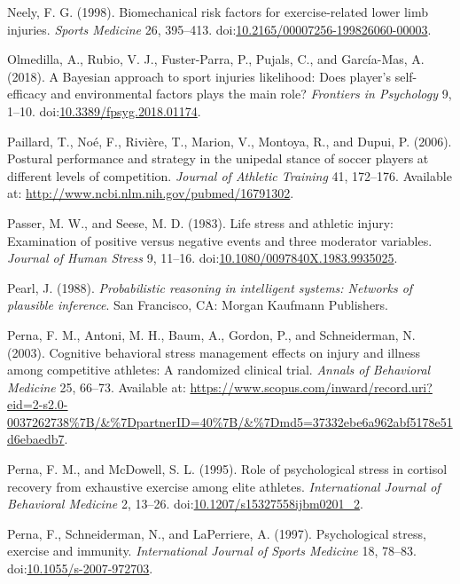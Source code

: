 \documentclass[
  english,
  man]{apa6}
\newlength{\cslhangindent}
\newenvironment{cslreferences}%
  {\setlength{\parindent}{0pt}%
  \everypar{\setlength{\hangindent}{\cslhangindent}}\ignorespaces}%
  {\par}
\begin{document}
\begin{cslreferences}
\leavevmode\hypertarget{ref-Neely1998}{}%
Neely, F. G. (1998). Biomechanical risk factors for exercise-related lower limb injuries. \emph{Sports Medicine} 26, 395--413. doi:\href{https://doi.org/10.2165/00007256-199826060-00003}{10.2165/00007256-199826060-00003}.

\leavevmode\hypertarget{ref-Olmedilla2018}{}%
Olmedilla, A., Rubio, V. J., Fuster-Parra, P., Pujals, C., and García-Mas, A. (2018). A Bayesian approach to sport injuries likelihood: Does player's self-efficacy and environmental factors plays the main role? \emph{Frontiers in Psychology} 9, 1--10. doi:\href{https://doi.org/10.3389/fpsyg.2018.01174}{10.3389/fpsyg.2018.01174}.

\leavevmode\hypertarget{ref-Paillard2006}{}%
Paillard, T., Noé, F., Rivière, T., Marion, V., Montoya, R., and Dupui, P. (2006). Postural performance and strategy in the unipedal stance of soccer players at different levels of competition. \emph{Journal of Athletic Training} 41, 172--176. Available at: \url{http://www.ncbi.nlm.nih.gov/pubmed/16791302}.

\leavevmode\hypertarget{ref-Passer1983a}{}%
Passer, M. W., and Seese, M. D. (1983). Life stress and athletic injury: Examination of positive versus negative events and three moderator variables. \emph{Journal of Human Stress} 9, 11--16. doi:\href{https://doi.org/10.1080/0097840X.1983.9935025}{10.1080/0097840X.1983.9935025}.

\leavevmode\hypertarget{ref-Pearl1988}{}%
Pearl, J. (1988). \emph{Probabilistic reasoning in intelligent systems: Networks of plausible inference}. San Francisco, CA: Morgan Kaufmann Publishers.

\leavevmode\hypertarget{ref-Perna2003}{}%
Perna, F. M., Antoni, M. H., Baum, A., Gordon, P., and Schneiderman, N. (2003). Cognitive behavioral stress management effects on injury and illness among competitive athletes: A randomized clinical trial. \emph{Annals of Behavioral Medicine} 25, 66--73. Available at: \url{https://www.scopus.com/inward/record.uri?eid=2-s2.0-0037262738\%7B/\&\%7DpartnerID=40\%7B/\&\%7Dmd5=37332ebe6a962abf5178e51d6ebaedb7}.

\leavevmode\hypertarget{ref-Perna1995}{}%
Perna, F. M., and McDowell, S. L. (1995). Role of psychological stress in cortisol recovery from exhaustive exercise among elite athletes. \emph{International Journal of Behavioral Medicine} 2, 13--26. doi:\href{https://doi.org/10.1207/s15327558ijbm0201_2}{10.1207/s15327558ijbm0201\_2}.

\leavevmode\hypertarget{ref-Perna1997}{}%
Perna, F., Schneiderman, N., and LaPerriere, A. (1997). Psychological stress, exercise and immunity. \emph{International Journal of Sports Medicine} 18, 78--83. doi:\href{https://doi.org/10.1055/s-2007-972703}{10.1055/s-2007-972703}.


\end{cslreferences}
\end{document}
